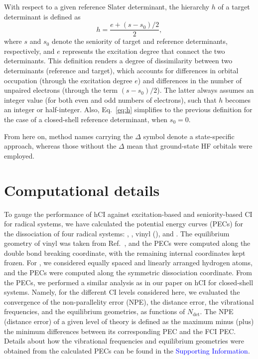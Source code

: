 \documentclass[aip,jcp,reprint,noshowkeys,superscriptaddress]{revtex4-1}
\newcommand{\SupInf}{\textcolor{blue}{Supporting Information}}
\newcommand{\Ndet}{N_\text{det}}
\begin{document}
With respect to a given reference Slater determinant, the hierarchy $h$ of a target determinant is defined as
\begin{equation}
        \label{eq:h}
	h = \frac{e+ (s-s_0)/2}{2},
\end{equation}
where $s$ and $s_0$ denote the seniority of target and reference determinants, respectively, and $e$ represents the excitation degree that connect the two determinants.
This definition renders a degree of dissimilarity between two determinants (reference and target),
which accounts for differences in orbital occupation (through the excitation degree $e$)
and differences in the number of unpaired electrons (through the term $(s-s_0)/2$).
The latter always assumes an integer value (for both even and odd numbers of electrons), such that $h$ becomes an integer or half-integer.
Also, Eq.~\eqref{eq:h} simplifies to the previous definition \cite{Kossoski_2022} for the case of a closed-shell reference determinant, when $s_0 = 0$.

From here on, method names carrying the $\Delta$ symbol denote a state-specific approach,
whereas those without the $\Delta$ mean that ground-state HF orbitals were employed.


\section{Computational details}
\label{sec:compdet}

To gauge the performance of hCI against excitation-based and seniority-based CI for radical systems,
we have calculated the potential energy curves (PECs) for the dissociation of four radical systems:
, , vinyl (), and .
The equilibrium geometry of vinyl was taken from Ref.~,
and the PECs were computed along the  double bond breaking coordinate, with the remaining internal coordinates kept frozen.
For , we considered equally spaced and linearly arranged hydrogen atoms, and the PECs were computed along the symmetric dissociation coordinate.
From the PECs, we performed a similar analysis as in our paper on hCI for closed-shell systems. \cite{Kossoski_2022}
Namely, for the different CI levels considered here, 
we evaluated the convergence of the non-parallelity error (NPE), the distance error, the vibrational frequencies, and the equilibrium geometries, as functions of $\Ndet$.
The NPE (distance error) of a given level of theory is defined as the maximum minus (plus) the minimum differences between its corresponding PEC and the FCI PEC.
Details about how the vibrational frequencies and equilibrium geometries were obtained from the calculated PECs can be found in the \SupInf.
\end{document}
